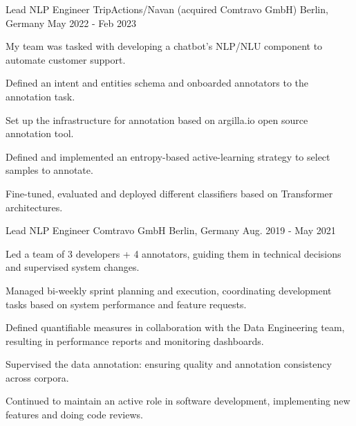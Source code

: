 \begin{cventries}
  \cventry
    {Lead NLP Engineer} %
    {TripActions/Navan (acquired Comtravo GmbH)} %
    {Berlin, Germany} %
    {May 2022 - Feb 2023} %
	{
      \begin{cvitems} %
		\item {My team was tasked with developing a chatbot's NLP/NLU component to automate customer support.}
		\item {Defined an intent and entities schema and onboarded annotators to the annotation task.}
		\item {Set up the infrastructure for annotation based on argilla.io open source annotation tool.}
		\item {Defined and implemented an entropy-based active-learning strategy to select samples to annotate.}
		\item {Fine-tuned, evaluated and deployed different classifiers based on Transformer architectures.}
      \end{cvitems}
    }



\cventry
    {Lead NLP Engineer} 
    {Comtravo GmbH} 
    {Berlin, Germany} 
    {Aug. 2019 - May 2021}
    {
      \begin{cvitems} 
		  \item {Led a team of 3 developers + 4 annotators, guiding them in technical decisions and supervised system changes.}
		  \item {Managed bi-weekly sprint planning and execution, coordinating development tasks based on system performance and feature requests.}
		  \item {Defined quantifiable measures in collaboration with the Data Engineering team, resulting in performance reports and monitoring dashboards.}
		  \item {Supervised the data annotation: ensuring quality and annotation consistency across corpora.}
		  \item {Continued to maintain an active role in software development, implementing new features and doing code reviews.}
        \end{cvitems}
 	}



\end{cventries}
